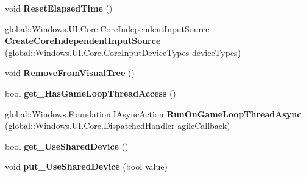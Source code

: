 \begin{DoxyCompactItemize}
void {\bfseries Reset\+Elapsed\+Time} ()
\item 
\mbox{\label{class_microsoft_1_1_graphics_1_1_canvas_1_1_u_i_1_1_xaml_1_1_canvas_animated_control_a76d5f55f3181192f77d2b72cdfdaee78}} 
global\+::\+Windows.\+U\+I.\+Core.\+Core\+Independent\+Input\+Source {\bfseries Create\+Core\+Independent\+Input\+Source} (global\+::\+Windows.\+U\+I.\+Core.\+Core\+Input\+Device\+Types device\+Types)
\item 
\mbox{\label{class_microsoft_1_1_graphics_1_1_canvas_1_1_u_i_1_1_xaml_1_1_canvas_animated_control_a8c050c528e9a7e6420d73b876e6076c0}} 
void {\bfseries Remove\+From\+Visual\+Tree} ()
\item 
\mbox{\label{class_microsoft_1_1_graphics_1_1_canvas_1_1_u_i_1_1_xaml_1_1_canvas_animated_control_a2b8dde3fa5be471394533ca75407cea5}} 
bool {\bfseries get\+\_\+\+Has\+Game\+Loop\+Thread\+Access} ()
\item 
\mbox{\label{class_microsoft_1_1_graphics_1_1_canvas_1_1_u_i_1_1_xaml_1_1_canvas_animated_control_a4cfd047932cd7d4165b53982ff676126}} 
global\+::\+Windows.\+Foundation.\+I\+Async\+Action {\bfseries Run\+On\+Game\+Loop\+Thread\+Async} (global\+::\+Windows.\+U\+I.\+Core.\+Dispatched\+Handler agile\+Callback)
\item 
\mbox{\label{class_microsoft_1_1_graphics_1_1_canvas_1_1_u_i_1_1_xaml_1_1_canvas_animated_control_a4ecc9ba2b48c0c82c98292d4c56ce566}} 
bool {\bfseries get\+\_\+\+Use\+Shared\+Device} ()
\item 
\mbox{\label{class_microsoft_1_1_graphics_1_1_canvas_1_1_u_i_1_1_xaml_1_1_canvas_animated_control_a4cf16f645c5c041b2789957edfabba6f}} 
void {\bfseries put\+\_\+\+Use\+Shared\+Device} (bool value)
\item 
\mbox{\label{class_microsoft_1_1_graphics_1_1_canvas_1_1_u_i_1_1_xaml_1_1_canvas_animated_control_a7832872f65d5600713fbe9a68d782b54}} 

\end{DoxyCompactItemize}
